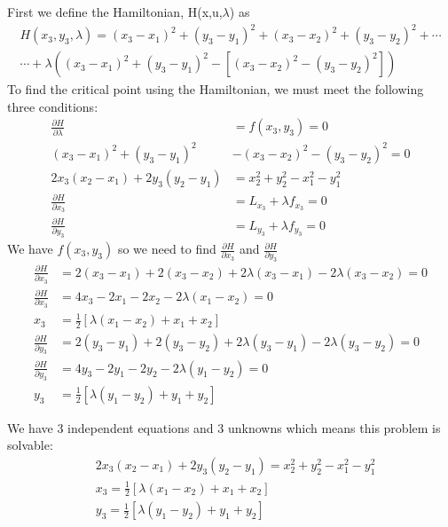 \documentclass{article}
\begin{document}
  \noindent First we define the Hamiltonian, H(x,u,$\lambda$) as 
  \begin{multline*}
    H(x_3, y_3, \lambda) = (x_3-x_1)^2 + (y_3-y_1)^2 + (x_3-x_2)^2 + (y_3-y_2)^2 + \cdots \\ \cdots + \lambda ((x_3-x_1)^2 + (y_3-y_1)^2 - [(x_3-x_2)^2 - (y_3-y_2)^2]) \tag{3.5}
  \end{multline*}
  To find the critical point using the Hamiltonian, we must meet the following three conditions:
  \begin{align*}
    \frac{\partial H}{\partial \lambda} &= f(x_3, y_3) = 0 \\
    (x_3 - x_1)^2 + (y_3-y_1)^2 &- (x_3 - x_2)^2 - (y_3-y_2)^2 = 0  \\
    2x_3(x_2-x_1) + 2y_3(y_2-y_1) &= x_2^2 + y_2^2 - x_1^2 - y_1^2 \tag{3.6} \\
    \frac{\partial H}{\partial x_3} &= L_{x_3} + \lambda f_{x_3}= 0 \tag{3.7} \\
    \frac{\partial H}{\partial y_3} &= L_{y_3} + \lambda f_{y_3} = 0 \tag{3.8} 
  \end{align*}
  We have $f(x_3,y_3)$ so we need to find $\frac{\partial H}{\partial x_3}$ and $\frac{\partial H}{\partial y_3}$
  \begin{align*}
    \frac{\partial H}{\partial x_3} &= 2(x_3-x_1) + 2(x_3-x_2) + 2\lambda(x_3-x_1) - 2\lambda(x_3-x_2) = 0 \\
    \frac{\partial H}{\partial x_3} &= 4x_3 - 2x_1 -2x_2 - 2\lambda(x_1-x_2) = 0 \\
    x_3 &= \frac{1}{2}[\lambda(x_1-x_2) + x_1 + x_2] \tag{3.9} \\
    \frac{\partial H}{\partial y_3} &= 2(y_3-y_1) + 2(y_3-y_2) + 2\lambda(y_3-y_1) - 2\lambda(y_3-y_2) = 0 \\
    \frac{\partial H}{\partial y_3} &= 4y_3 - 2y_1 -2y_2 - 2\lambda(y_1-y_2) = 0 \\
    y_3 &= \frac{1}{2}[\lambda(y_1-y_2) + y_1 + y_2] \tag{3.10} 
  \end{align*}

  We have 3 independent equations and 3 unknowns which means this problem is solvable:
  \begin{align*}
    &2x_3(x_2-x_1) + 2y_3(y_2-y_1) = x_2^2 + y_2^2 - x_1^2 - y_1^2 \\
    &x_3 = \frac{1}{2}[\lambda(x_1-x_2) + x_1 + x_2] \\
    &y_3 = \frac{1}{2}[\lambda(y_1-y_2) + y_1 + y_2]
  \end{align*}
\end{document}
